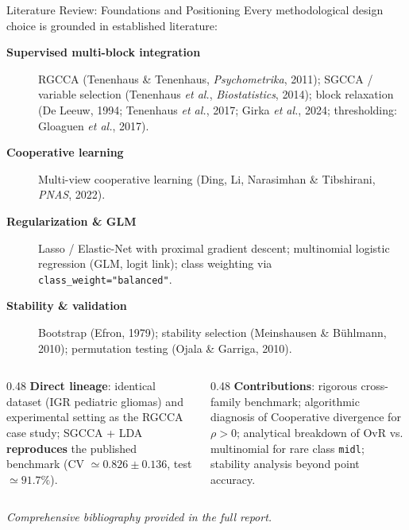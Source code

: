 \documentclass[aspectratio=169, 10pt]{beamer}
\begin{document}
\begin{frame}{Literature Review: Foundations and Positioning}
  Every methodological design choice is grounded in established literature:
  \begin{description}
    \item[\textbf{Supervised multi-block integration}] RGCCA (Tenenhaus \& Tenenhaus, \textit{Psychometrika}, 2011); SGCCA / variable selection (Tenenhaus \textit{et al.}, \textit{Biostatistics}, 2014); block relaxation (De Leeuw, 1994; Tenenhaus \textit{et al.}, 2017; Girka \textit{et al.}, 2024; thresholding: Gloaguen \textit{et al.}, 2017).
    \item[\textbf{Cooperative learning}] Multi-view cooperative learning (Ding, Li, Narasimhan \& Tibshirani, \textit{PNAS}, 2022).
    \item[\textbf{Regularization \& GLM}] Lasso / Elastic-Net with proximal gradient descent; multinomial logistic regression (GLM, logit link); class weighting via \texttt{class\_weight="balanced"}.
    \item[\textbf{Stability \& validation}] Bootstrap (Efron, 1979); stability selection (Meinshausen \& Bühlmann, 2010); permutation testing (Ojala \& Garriga, 2010).
  \end{description}

  \begin{columns}[T]
    \begin{column}{0.48\textwidth}
      \textbf{Direct lineage}: identical dataset (IGR pediatric gliomas) and experimental setting as the RGCCA case study; SGCCA + LDA \textbf{reproduces} the published benchmark (CV $\simeq 0.826 \pm 0.136$, test $\simeq 91.7\%$).
    \end{column}
    \begin{column}{0.48\textwidth}
      \textbf{Contributions}: rigorous cross-family benchmark; algorithmic diagnosis of Cooperative divergence for $\rho > 0$; analytical breakdown of OvR vs. multinomial for rare class \texttt{midl}; stability analysis beyond point accuracy.
    \end{column}
  \end{columns}

  \smallskip
  \textit{Comprehensive bibliography provided in the full report.}
\end{frame}
\end{document}
